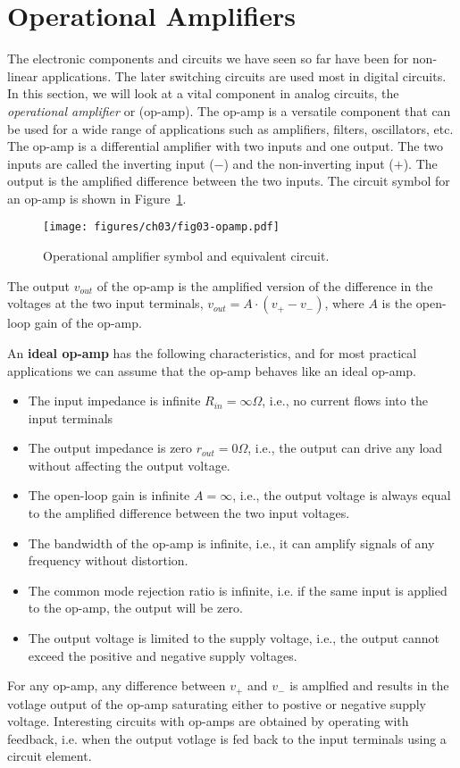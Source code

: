 \section{Operational Amplifiers}
The electronic components and circuits we have seen so far have been for non-linear applications. The later switching circuits are used most in digital circuits. In this section, we will look at a vital component in analog circuits, the \textit{operational amplifier} or (op-amp). The op-amp is a versatile component that can be used for a wide range of applications such as amplifiers, filters, oscillators, etc. The op-amp is a differential amplifier with two inputs and one output. The two inputs are called the inverting input ($-$) and the non-inverting input ($+$). The output is the amplified difference between the two inputs. The circuit symbol for an op-amp is shown in Figure~\ref{fig:03-opamp-symbol}. 
\begin{figure}[htbp]
    \centering
    \texttt{[image: figures/ch03/fig03-opamp.pdf]}
    \caption{Operational amplifier symbol and equivalent circuit.}
    \label{fig:03-opamp-symbol}
\end{figure}
The output $v_{out}$ of the op-amp is the amplified version of the difference in the voltages at the two input terminals, $v_{out} = A \cdot \left(v_{+} - v_{-}\right)$, where $A$ is the open-loop gain of the op-amp.

An \textbf{ideal op-amp} has the following characteristics, and for most practical applications we can assume that the op-amp behaves like an ideal op-amp.
\begin{itemize}
    \item The input impedance is infinite $R_{in} = \infty \Omega$, i.e., no current flows into the input terminals
    \item The output impedance is zero $r_{out} = 0 \Omega$, i.e., the output can drive any load without affecting the output voltage.
    \item The open-loop gain is infinite $A = \infty$, i.e., the output voltage is always equal to the amplified difference between the two input voltages.
    \item The bandwidth of the op-amp is infinite, i.e., it can amplify signals of any frequency without distortion.
    \item The common mode rejection ratio is infinite, i.e. if the same input is applied to the op-amp, the output will be zero.
    \item The output voltage is limited to the supply voltage, i.e., the output cannot exceed the positive and negative supply voltages.
\end{itemize}
For any op-amp, any difference between $v_{+}$ and $v_{-}$ is amplfied and results in the votlage output of the op-amp saturating either to postive or negative supply voltage. Interesting circuits with op-amps are obtained by operating with feedback, i.e. when the output votlage is fed back to the input terminals using a circuit element.

